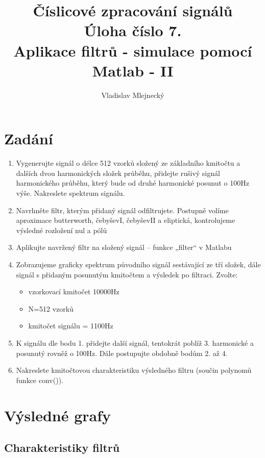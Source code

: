 \documentclass[11pt, a4paper]{article}
\author{Vladislav Mlejnecký}
\title{%
  Číslicové zpracování signálů\\
  \large Úloha číslo 7.\\
  Aplikace filtrů - simulace pomocí Matlab - II}
\begin{document}
    \maketitle
    
    \section{Zadání}
        \begin{enumerate}
            \item
            Vygenerujte signál o délce 512 vzorků složený ze základního kmitočtu a dalších dvou
            harmonických složek průběhu, přidejte rušivý signál harmonického průběhu, který bude od
            druhé harmonické posunut o 100Hz výše. Nakreslete spektrum signálu.
            \item
            Navrhněte filtr, kterým přidaný signál odfiltrujete. Postupně volíme aproximace
            butterworth, čebyševI, čebyševII a eliptická, kontrolujeme výsledné rozložení nul a pólů
            \item
            Aplikujte navržený filtr na složený signál – funkce „filter“ v Matlabu
            \item
            Zobrazujeme graficky spektrum původního signál sestávající ze tří složek, dále signál
            s přidaným posunutým kmitočtem a výsledek po filtraci.
            Zvolte:
            \begin{itemize}
                \item vzorkovací kmitočet 10000Hz
                \item N=512 vzorků
                \item kmitočet signálu = 1100Hz
            \end{itemize}
            \item
            K signálu dle bodu 1. přidejte další signál, tentokrát poblíž 3. harmonické a posunutý rovněž
            o 100Hz. Dále postupujte obdobně bodům 2. až 4.
            \item
            Nakreslete kmitočtovou charakteristiku výsledného filtru (součin polynomů funkce conv()).
        \end{enumerate}
                
    \section{Výsledné grafy}
    
        \subsection{Charakteristiky filtrů}
        
\end{document}
